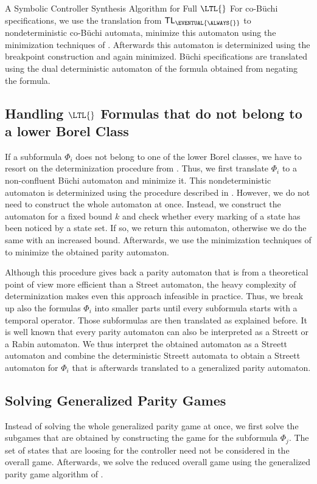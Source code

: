 \documentclass[copyright,creativecommons]{eptcs}
\begin{document}
\begin{section}{A Symbolic Controller Synthesis Algorithm for Full $\LTL{}$}
For co-Büchi specifications, we use the translation from ${\sf TL_{\EVENTUAL{\ALWAYS{}}}}$ to nondeterministic co-Büchi automata, minimize this automaton using the minimization techniques of \cite{Frit05b}. Afterwards this automaton is determinized using the breakpoint construction and again minimized. Büchi specifications are translated using the dual deterministic automaton of the formula obtained from negating the formula.


\subsection{Handling $\LTL{}$ Formulas that do not belong to a lower Borel Class}

If a subformula $\Phi_i$ does not belong to one of the lower Borel classes, we have to resort on the determinization procedure from \cite{MoSc08}. Thus, we first translate $\Phi_i$ to a non-confluent Büchi automaton and minimize it. This nondeterministic automaton is determinized using the procedure described in \cite{MoSc08}. However, we do not need to construct the whole automaton at once. Instead, we construct the automaton for a fixed bound $k$ and check whether every marking of a state has been noticed by a state set. If so, we return this automaton, otherwise we do the same with an increased bound. Afterwards, we use the minimization techniques of \cite{Frit05b} to minimize the obtained parity automaton.

Although this procedure gives back a parity automaton that is from a theoretical point of view more efficient than a Street automaton, the heavy complexity of determinization makes even this approach infeasible in practice. Thus, we break up also the formulas $\Phi_i$ into smaller parts until every subformula starts with a temporal operator. Those subformulas are then translated as explained before. It is well known that every parity automaton can also be interpreted as a Streett or a Rabin automaton. We thus interpret the obtained automaton as a Streett automaton and combine the deterministic Streett automata to obtain a Streett automaton for $\Phi_i$ that is afterwards translated to a generalized parity automaton.



\subsection{Solving Generalized Parity Games}
Instead of solving the whole generalized parity game at once, we first solve the subgames that are obtained by constructing the game for the subformula $\Phi_j$. The set of states that are loosing for the controller need not be considered in the overall game. Afterwards, we solve the reduced overall game using the generalized parity game algorithm of \cite{ChHP07a}.


\end{section}
\end{document}
